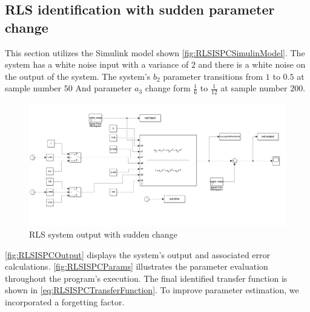 \FloatBarrier
\subsection{RLS identification with sudden parameter change}

This section utilizes the Simulink model shown \autoref{fig:RLSISPCSimulinModel}. The system has a white noise input with a variance of $2$ and there is a white noise on the output of the system.
The system's $b_2$ parameter transitions from $1$ to $0.5$ at sample number $50$ And parameter $a_3$ change form $\frac{1}{6}$ to $\frac{1}{12}$ at sample number $200$.

\begin{figure}
	\centering
	\includegraphics[totalheight=8cm]{images/RLSISPCSimulinkModel.png}
	\caption{RLS system output with sudden change}
	\label{fig:RLSISPCSimulinModel}
\end{figure}

\autoref{fig:RLSISPCOutput} displays the system's output and associated error calculations. \autoref{fig:RLSISPCParams} illustrates the parameter evaluation throughout the program's execution. The final identified transfer function is shown in \autoref{eq:RLSISPCTransferFunction}. To improve parameter estimation, we incorporated a forgetting factor.

